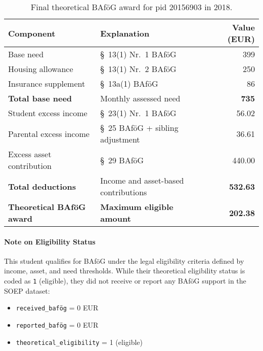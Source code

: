 \begin{table}[H]
\scriptsize
\centering
\begin{tabular}{llr}
\toprule
\textbf{Component} & \textbf{Explanation} & \textbf{Value (EUR)} \\
\midrule
Base need & §~13(1) Nr.~1 BAföG & 399 \\
Housing allowance & §~13(1) Nr.~2 BAföG & 250 \\
Insurance supplement & §~13a(1) BAföG & 86 \\
\midrule
\textbf{Total base need} & Monthly assessed need & \textbf{735} \\
\midrule
Student excess income & §~23(1) Nr.~1 BAföG & 56.02 \\
Parental excess income & §~25 BAföG + sibling adjustment & 36.61 \\
Excess asset contribution & §~29 BAföG & 440.00 \\
\midrule
\textbf{Total deductions} & Income and asset-based contributions & \textbf{532.63} \\
\midrule
\textbf{Theoretical BAföG award} & \textbf{Maximum eligible amount} & \textbf{202.38} \\
\bottomrule
\end{tabular}
\caption{Final theoretical BAföG award for pid 20156903 in 2018.}
\label{table:bafoeg_final_award}
\end{table}

\paragraph{Note on Eligibility Status}

This student qualifies for BAföG under the legal eligibility criteria defined by income, asset, and need thresholds. While their theoretical eligibility status is coded as \texttt{1} (eligible), they did not receive or report any BAföG support in the SOEP dataset:

\begin{itemize}
    \item \texttt{received\_bafög} = 0 EUR
    \item \texttt{reported\_bafög} = 0 EUR
    \item \texttt{theoretical\_eligibility} = 1 (eligible)
\end{itemize}
